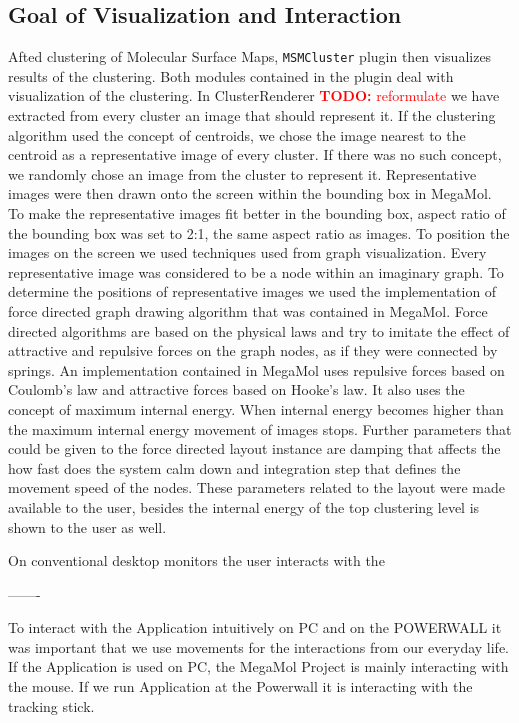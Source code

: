 \documentclass[journal]{vgtc}       %
\newcommand{\todo}[1]{\textcolor{red}{\textbf{TODO:} #1}}
\begin{document}
\subsection{Goal of Visualization and Interaction}
Afted clustering of Molecular Surface Maps, \verb|MSMCluster| plugin then visualizes results of the clustering. Both modules contained in the plugin deal with visualization of the clustering. 
In ClusterRenderer \todo{reformulate} we have extracted from every cluster an image that should represent it. If the clustering algorithm used the concept of centroids, we chose the image nearest to the centroid as a representative image of every cluster. If there was no such concept, we randomly chose an image from the cluster to represent it. Representative images were then drawn onto the screen within the bounding box in MegaMol. To make the representative images fit better in the bounding box, aspect ratio of the bounding box was set to 2:1, the same aspect ratio as images.
To position the images on the screen we used techniques used from graph visualization. Every representative image was considered to be a node within an imaginary graph. To determine the positions of representative images we used the implementation of force directed graph drawing algorithm that was contained in MegaMol. Force directed algorithms are based on the physical laws and try to imitate the effect of attractive and repulsive forces on the graph nodes, as if they were connected by springs. An implementation contained in MegaMol uses repulsive forces based on Coulomb's law and attractive forces based on Hooke’s law. It also uses the concept of maximum internal energy. When internal energy becomes higher than the maximum internal energy movement of images stops. Further parameters that could be given to the force directed layout instance are damping that affects the how fast does the system calm down and integration step that defines the movement speed of the nodes. 
These parameters related to the layout were made available to the user, besides the internal energy of the top clustering level is shown to the user as well.

On conventional desktop monitors the user interacts with the 


------- 

To interact with the Application intuitively on PC and on the POWERWALL it was important that we use movements for the interactions from our everyday life. If the Application is used on PC, the MegaMol Project is mainly interacting with the mouse. If we run Application at the Powerwall it is interacting with the tracking stick.
\end{document}
